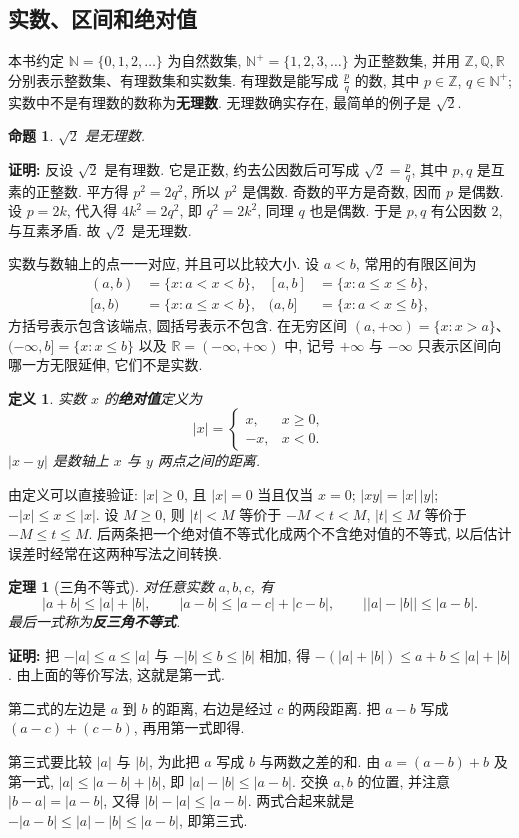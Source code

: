 \documentclass[UTF8,openany]{ctexbook}
\theoremstyle{chinesetextbook}
\newtheorem{definition}{定义}[section]
\newtheorem{theorem}{定理}[section]
\newenvironment{cnproof}{\par\indent\textbf{证明:} \ignorespaces}{\par}
\newtheorem*{propositionsingle}{命题}
\begin{document}
\subsection{实数、区间和绝对值}
本书约定 $\mathbb N=\{0,1,2,\ldots\}$ 为自然数集, $\mathbb N^+=\{1,2,3,\ldots\}$ 为正整数集, 并用 $\mathbb Z,\mathbb Q,\mathbb R$ 分别表示整数集、有理数集和实数集. 有理数是能写成 $\displaystyle\frac pq$ 的数, 其中 $p\in\mathbb Z$, $q\in\mathbb N^+$; 实数中不是有理数的数称为\textbf{无理数}. 无理数确实存在, 最简单的例子是 $\sqrt2$.
\begin{propositionsingle}
$\sqrt2$ 是无理数.
\end{propositionsingle}
\begin{cnproof}
反设 $\sqrt2$ 是有理数. 它是正数, 约去公因数后可写成 $\displaystyle\sqrt2=\frac pq$, 其中 $p,q$ 是互素的正整数. 平方得 $p^2=2q^2$, 所以 $p^2$ 是偶数. 奇数的平方是奇数, 因而 $p$ 是偶数. 设 $p=2k$, 代入得 $4k^2=2q^2$, 即 $q^2=2k^2$, 同理 $q$ 也是偶数. 于是 $p,q$ 有公因数 $2$, 与互素矛盾. 故 $\sqrt2$ 是无理数.
\end{cnproof}
实数与数轴上的点一一对应, 并且可以比较大小. 设 $a<b$, 常用的有限区间为
\[
\begin{aligned}
(a,b)&=\{x:a<x<b\},& [a,b]&=\{x:a\le x\le b\},\\
[a,b)&=\{x:a\le x<b\},& (a,b]&=\{x:a<x\le b\},
\end{aligned}
\]
方括号表示包含该端点, 圆括号表示不包含. 在无穷区间 $(a,+\infty)=\{x:x>a\}$、$(-\infty,b]=\{x:x\le b\}$ 以及 $\mathbb R=(-\infty,+\infty)$ 中, 记号 $+\infty$ 与 $-\infty$ 只表示区间向哪一方无限延伸, 它们不是实数.
\begin{definition}
实数 $x$ 的\textbf{绝对值}定义为
\[
|x|=\begin{cases}x,&x\ge0,\\-x,&x<0.\end{cases}
\]
$|x-y|$ 是数轴上 $x$ 与 $y$ 两点之间的距离.
\end{definition}
由定义可以直接验证: $|x|\ge0$, 且 $|x|=0$ 当且仅当 $x=0$; $|xy|=|x|\,|y|$; $-|x|\le x\le|x|$. 设 $M\ge0$, 则 $|t|<M$ 等价于 $-M<t<M$, $|t|\le M$ 等价于 $-M\le t\le M$. 后两条把一个绝对值不等式化成两个不含绝对值的不等式, 以后估计误差时经常在这两种写法之间转换.
\begin{theorem}[三角不等式]
对任意实数 $a,b,c$, 有
\[
|a+b|\le|a|+|b|,\qquad |a-b|\le|a-c|+|c-b|,\qquad \bigl||a|-|b|\bigr|\le|a-b|.
\]
最后一式称为\textbf{反三角不等式}.
\end{theorem}
\begin{cnproof}
把 $-|a|\le a\le|a|$ 与 $-|b|\le b\le|b|$ 相加, 得 $-(|a|+|b|)\le a+b\le|a|+|b|$. 由上面的等价写法, 这就是第一式.

第二式的左边是 $a$ 到 $b$ 的距离, 右边是经过 $c$ 的两段距离. 把 $a-b$ 写成 $(a-c)+(c-b)$, 再用第一式即得.

第三式要比较 $|a|$ 与 $|b|$, 为此把 $a$ 写成 $b$ 与两数之差的和. 由 $a=(a-b)+b$ 及第一式, $|a|\le|a-b|+|b|$, 即 $|a|-|b|\le|a-b|$. 交换 $a,b$ 的位置, 并注意 $|b-a|=|a-b|$, 又得 $|b|-|a|\le|a-b|$. 两式合起来就是 $-|a-b|\le|a|-|b|\le|a-b|$, 即第三式.
\end{cnproof}
\end{document}
